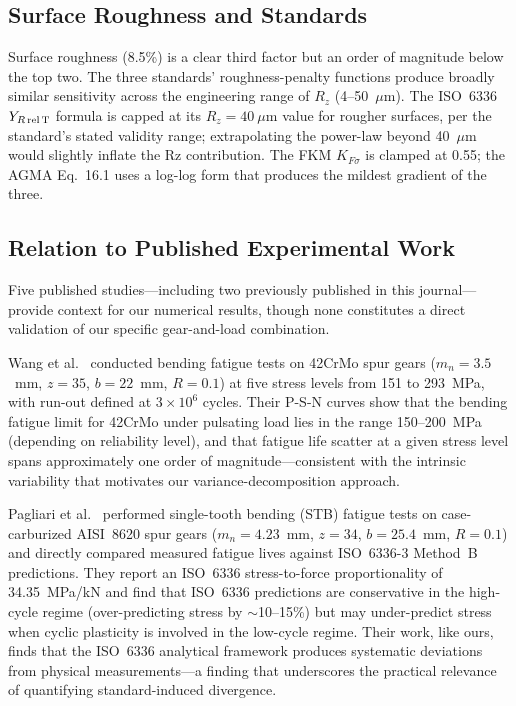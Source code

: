 \documentclass[12pt,a4paper]{article}
\begin{document}
\subsection{Surface Roughness and Standards}

Surface roughness (8.5\%) is a clear third factor but an order of
magnitude below the top two. The three standards' roughness-penalty
functions produce broadly similar sensitivity across the engineering
range of $R_z$ (4--50~$\mu$m). The ISO~6336 $Y_{R\,\rm rel\,T}$ formula
is capped at its $R_z=40~\mu$m value for rougher surfaces, per the
standard's stated validity range; extrapolating the power-law beyond
40~$\mu$m would slightly inflate the Rz contribution. The FKM $K_{F\sigma}$
is clamped at 0.55; the AGMA Eq.~16.1 uses a log-log form that produces
the mildest gradient of the three.

\subsection{Relation to Published Experimental Work}

Five published studies---including two previously published in
this journal---provide context for our numerical results, though
none constitutes a direct validation of our specific
gear-and-load combination.

Wang et al.~\cite{wang2023} conducted bending fatigue tests on 42CrMo
spur gears ($m_n{=}3.5$~mm, $z{=}35$, $b{=}22$~mm, $R{=}0.1$) at five
stress levels from 151 to 293~MPa, with run-out defined at $3\times10^6$
cycles. Their P-S-N curves show that the bending fatigue limit for
42CrMo under pulsating load lies in the range 150--200~MPa (depending on
reliability level), and that fatigue life scatter at a given stress level
spans approximately one order of magnitude---consistent with the
intrinsic variability that motivates our variance-decomposition approach.

Pagliari et al.~\cite{pagliari2025} performed single-tooth bending (STB)
fatigue tests on case-carburized AISI~8620 spur gears
($m_n{=}4.23$~mm, $z{=}34$, $b{=}25.4$~mm, $R{=}0.1$) and directly
compared measured fatigue lives against ISO~6336-3 Method~B predictions.
They report an ISO~6336 stress-to-force proportionality of
34.35~MPa/kN and find that ISO~6336 predictions are conservative in the
high-cycle regime (over-predicting stress by $\sim$10--15\%) but may
under-predict stress when cyclic plasticity is involved in the low-cycle
regime. Their work, like ours, finds that the ISO~6336 analytical
framework produces systematic deviations from physical measurements---a
finding that underscores the practical relevance of quantifying
standard-induced divergence.
\end{document}
